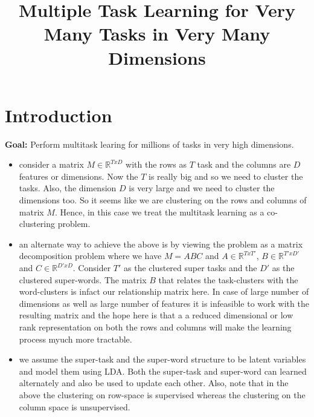 \documentclass[10pts,fleqn]{article}
\title{Multiple Task Learning for Very Many Tasks in Very Many Dimensions}
\newenvironment{packeditemize}{
\begin{itemize}
  \setlength{\itemsep}{1pt}
  \setlength{\parskip}{-2pt}
  \setlength{\parsep}{-2pt}
}{\end{itemize}}
\begin{document}
\maketitle

\begin{abstract}
\end{abstract}



\section{Introduction}

{\bf Goal:} Perform multitask learing for millions of tasks in very high dimensions.

\begin{itemize}
	\item consider a matrix $M \in \mathbb{R}^{TxD}$ with the rows as $T$ task and the columns are $D$ features or dimensions. Now the $T$ is really big and so we need to cluster the tasks. Also, the dimension $D$ is very large and we need to cluster the dimensions too. So it seems like we are clustering on the rows and columns of matrix $M$. Hence, in this case we treat the multitask learning as a co-clustering problem.
	\item an alternate way to achieve the above is by viewing the problem as a matrix decomposition problem where we have $M = ABC$ and $A \in \mathbb{R}^{TxT'}$, $B \in \mathbb{R}^{T'xD'}$ and $C \in \mathbb{R}^{D'xD}$. Consider $T'$ as the clustered super tasks and the $D'$ as the clustered super-words. The matrix $B$ that relates the task-clusters with the word-clusters is infact our relationship matrix here. In case of large number of dimensions as well as large number of features it is infeasible to work with the resulting matrix and the hope here is that a a reduced dimensional or low rank representation on both the rows and columns will make the learning process myuch more tractable.
	\item we assume the super-task and the super-word structure to be latent variables and model them using LDA. Both the super-task and super-word can learned alternately and also be used to update each other. Also, note that in the above the clustering on row-space is supervised whereas the clustering on the column space is unsupervised.
\end{itemize}
\end{document}
